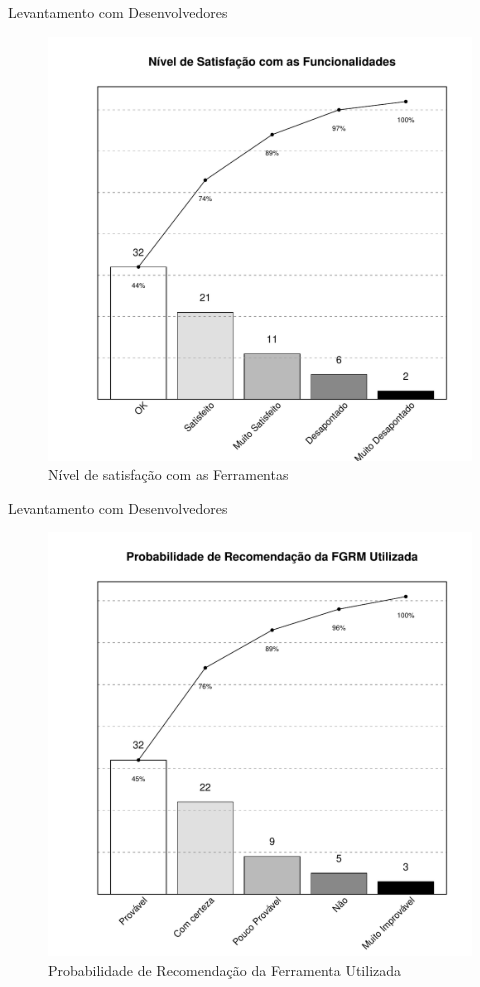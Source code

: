 \documentclass[t,14pt,mathserif]{beamer}
\begin{document}
\begin{frame}{Levantamento com Desenvolvedores}

\begin{figure}[htpb] \centering
    \includegraphics[width=0.5\linewidth]{../img/grafico_melhorias_fgrm_nivel_satisfacao.pdf}
    \caption{Nível de satisfação com as Ferramentas}
\label{fig:grafico_melhorias_fgrm_nivel_satisfacao}
\end{figure}

\end{frame}

\begin{frame}{Levantamento com Desenvolvedores}

\begin{figure}[htpb]
	\centering
	\includegraphics[width=0.45\linewidth]{../img/grafico_melhorias_fgrm_probabilidade_recomentacao.pdf}
	\caption{Probabilidade de Recomendação da Ferramenta Utilizada}
\label{fig:grafico_melhorias_fgrm_probabilidade_recomentacao}
\end{figure}

\end{frame}
\end{document}
